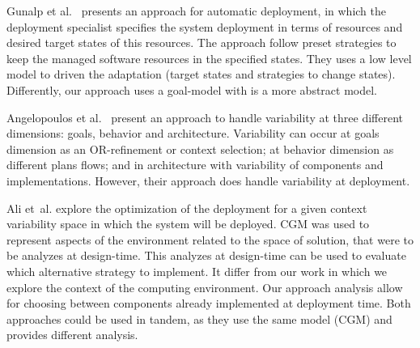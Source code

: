 Gunalp et al.~\citep{gunalp_rondo_2015} presents an approach for automatic deployment, in which the deployment specialist specifies the system deployment in terms of resources and desired target states of this resources. The approach follow preset strategies to keep the managed software resources in the specified states. They uses a low level model to driven the adaptation (target states and strategies to change states). Differently, our approach uses a goal-model with is a more abstract model.

Angelopoulos et al.~\cite{angelopoulos_capturing_2015} present an approach to handle  variability at three different dimensions: goals, behavior and architecture. Variability can occur at goals dimension as an OR-refinement or context selection; at behavior dimension as different plans flows; and in architecture with variability of components and implementations. However, their approach does handle variability at deployment.


Ali et~al.\cite{ali_requirements-driven_2014} explore the optimization of the deployment for a given context variability space in which the system will be deployed. CGM was used to represent aspects of the environment related to the space of solution, that were to be analyzes at design-time. This analyzes at design-time can be used to evaluate which alternative strategy to implement.
It differ from our work in which we explore the context of the computing environment. Our approach analysis allow for choosing between components already implemented at deployment time. Both approaches could be used in tandem, as they use the same model (CGM) and provides different analysis.



